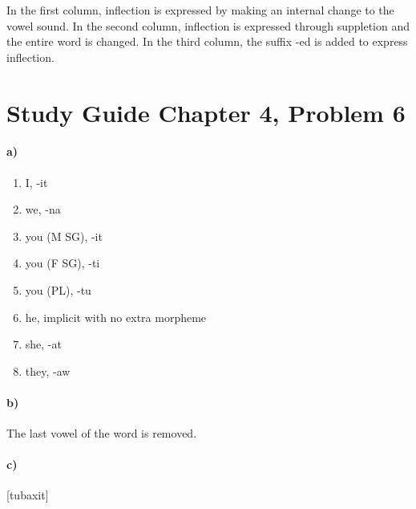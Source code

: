 \documentclass[12pt]{article}
\begin{document}
In the first column, inflection is expressed by making an internal change to the vowel sound. In the second column,
inflection is expressed through suppletion and the entire word is changed. In the third column, the suffix -ed is added
to express inflection.

\section*{Study Guide Chapter 4, Problem 6}

\paragraph{a)}

\begin{multicols}{2}
    \begin{enumerate}
        \item I, -it
        \item we, -na
        \item you (M SG), -it
        \item you (F SG), -ti
        \item you (PL), -tu
        \item he, implicit with no extra morpheme
        \item she, -at
        \item they, -aw
    \end{enumerate}
\end{multicols}

\paragraph{b)}

The last vowel of the word is removed.

\paragraph{c)}

[t\textsuperscript{\textrevglotstop}ubaxit]
\end{document}
